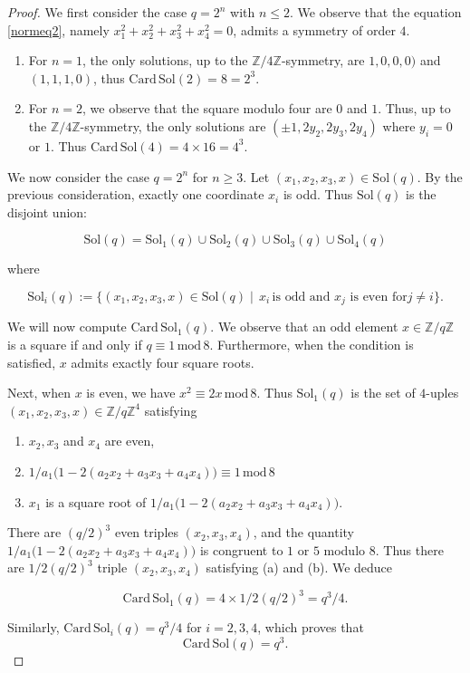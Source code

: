 \documentclass[10pt,a4paper]{amsart}
\newcommand{\Z}{\mathbb{Z}}
\newcommand{\Card}{\mathrm{Card\,}}
\newcommand{\Sol}{{\mathrm {Sol}}}
\renewcommand{\mod}{\,\mathrm{mod}\,}
\begin{document}
\begin{proof}
We first consider the case $q=2^n$ with $n\leq 2$.
We observe that the equation \ref{normeq2}, namely 
$x_1^2+x_2^2+x_3^2+x_4^2=0$, admits a symmetry of order $4$. 

\begin{enumerate}
\item[(a)] For $n=1$, the only solutions, up to the $\Z/4\Z$-symmetry, are
$1,0,0,0)$ and $(1,1,1,0)$, thus
  $\Card\Sol(2)=8=2^3.$
  
\item[(b)]
For $n=2$, we observe that the square modulo four
are $0$ and $1$. Thus, up to the $\Z/4\Z$-symmetry, the only solutions
are $(\pm1, 2y_2, 2y_3, 2 y_4)$ where $y_i=0$ or $1$.
Thus  $\Card\Sol(4)=4\times 16=4^3.$
\end{enumerate}

We now consider the case $q=2^n$ for $n\geq 3$. 
Let $(x_1,x_2,x_3,x)\in 
\Sol(q)$.
By the previous consideration, exactly one
coordinate $x_i$ is odd. Thus 
$\Sol(q)$ is the disjoint union:

$$\Sol(q)=\Sol_1(q)\cup\Sol_2(q)\cup\Sol_3(q)\cup\Sol_4(q)$$

\noindent where 

$$\Sol_i(q):=\{(x_1,x_2,x_3,x)\in 
\Sol(q)\mid\,x_i\,\text{is odd and } x_j \text{ is even for}
j\neq i\}.$$

We will now compute $\Card\Sol_1(q)$. We observe
that an odd element $x\in \Z/q\Z$ is a square
if and only if $q\equiv 1\mod 8$. Furthermore,  when the condition is satisfied, $x$ admits exactly four square roots.

Next, when $x$ is even, we have $x^2\equiv 2 x\mod 8$.
Thus $\Sol_1(q)$ is the set of $4$-uples 
$(x_1,x_2,x_3,x)\in\Z/q\Z^4$ satisfying

\begin{enumerate}
\item[(a)] $x_2, x_3$ and $x_4$ are even,
\item[(b)] $1/a_1\big(1-2(a_2x_2+a_3x_3+a_4x_4)\big)\equiv 1\mod 8$
\item[(c)] $x_1$ is a square root of 
$1/a_1\big(1-2(a_2x_2+a_3x_3+a_4x_4)\big)$.
\end{enumerate}

There are $(q/2)^3$ even triples $(x_2, x_3,x_4)$, and
the quantity 
$1/a_1\big(1-2(a_2x_2+a_3x_3+a_4x_4)\big)$ is congruent  to $1$ or $5$ modulo $8$. Thus there are $1/2 (q/2)^3$
triple $(x_2, x_3,x_4)$ satisfying (a) and (b). We deduce

$$\Card\Sol_1(q)=4\times 1/2(q/2)^3=q^3/4.$$

Similarly, $\Card\Sol_i(q)=q^3/4$ for $i=2,3, 4$, which proves that 
$$\Card\Sol(q)=q^3.$$
\end{proof}
\end{document}
